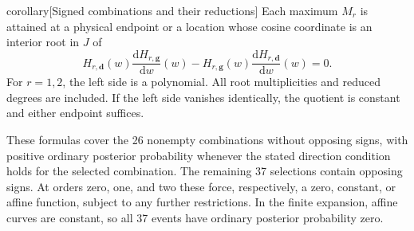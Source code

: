 \begin{theoremEnd}[normal,category=combinations]{corollary}[Signed combinations and their reductions]
Each maximum $M_r$ is attained at a physical endpoint or a location
whose cosine coordinate is an interior root in $J$ of
\[
 H_{r,\boldsymbol d}(w)\frac{\mathrm{d}H_{r,\boldsymbol g}}{\mathrm{d}w}(w)
 -H_{r,\boldsymbol g}(w)\frac{\mathrm{d}H_{r,\boldsymbol d}}{\mathrm{d}w}(w)=0.
\]
For $r=1,2$, the left side is a polynomial.
All root multiplicities and reduced degrees are included.
If the left side vanishes identically, the quotient is constant and
either endpoint suffices.

These formulas cover the 26 nonempty combinations without opposing
signs, with positive ordinary posterior probability whenever the
stated direction condition holds for the selected combination.
The remaining 37 selections contain opposing signs. At orders zero,
one, and two these force, respectively, a zero, constant, or affine
function, subject to any further restrictions. In the finite
expansion, affine curves are constant, so all 37 events have
ordinary posterior probability zero.
\end{theoremEnd}

